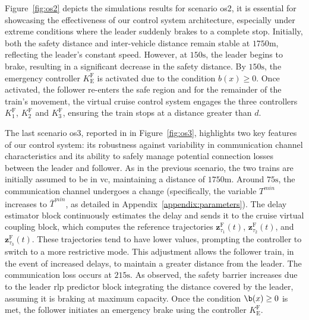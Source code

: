 \documentclass[letterpaper, 10 pt, conference]{ieeeconf}
\theoremstyle{definition}
\theoremstyle{nopoint}
\newcommand{\tildeAdd}{~}
\begin{document}
		Figure\tildeAdd\ref{fig:os2} depicts the simulations results for scenario \gls{os}2, it is essential for showcasing the effectiveness of our control system architecture, especially under extreme conditions where the leader suddenly brakes to a complete stop. Initially, both the safety distance and inter-vehicle distance remain stable at $1750\unit{\meter}$, reflecting the leader's constant speed. However, at $150\unit{\second}$, the leader begins to brake, resulting in a significant decrease in the safety distance. By $150\unit{\second}$, the emergency controller $K_{\mathrm{E}}^{\mathrm{F}}$ is activated due to the condition $b(x) \geq 0$. Once activated, the follower re-enters the safe region and for the remainder of the train's movement, the virtual cruise control system engages the three controllers \( K_1^{\mathrm{F}} \), \( K_2^{\mathrm{F}} \) and \( K_3^{\mathrm{F}} \), ensuring the train stops at a distance greater than $d$.
		
			
		The last scenario \gls{os}3, reported in in Figure\tildeAdd\ref{fig:os3},  highlights two key features of our control system: its robustness against variability in communication channel characteristics and its ability to safely manage potential connection losses between the leader and follower.
		As in the previous scenario, the two trains are initially assumed to be in \gls{vc}, maintaining a distance of $1750\unit{\meter}$. Around $75\unit{\second}$, the communication channel undergoes a change (specifically, the variable $T^{\textit{min}}$ increases to $\overline{T}^{\textit{min}}$, as detailed in Appendix~\ref{appendix:parameters}). The delay estimator block continuously estimates the delay and sends it to the cruise virtual coupling block, which computes the reference trajectories $\mathbf{z}_{\tau_1}^\mathrm{F}(t)$, $\mathbf{z}_{\tau_2}^\mathrm{F}(t)$, and $\mathbf{z}_{\tau_3}^\mathrm{F}(t)$. These trajectories tend to have lower values, prompting the controller to switch to a more restrictive mode. This adjustment allows the follower train, in the event of increased delays, to maintain a greater distance from the leader.
		The communication loss occurs at $215\unit{\second}$. As observed, the safety barrier increases due to the leader \gls{rlp} predictor block integrating the distance covered by the leader, assuming it is braking at maximum capacity. Once the condition $\b(x) \geq 0$ is met, the follower initiates an emergency brake using the controller $K_{\mathrm{E}}^{\mathrm{F}}$.
		
				
		
\end{document}
